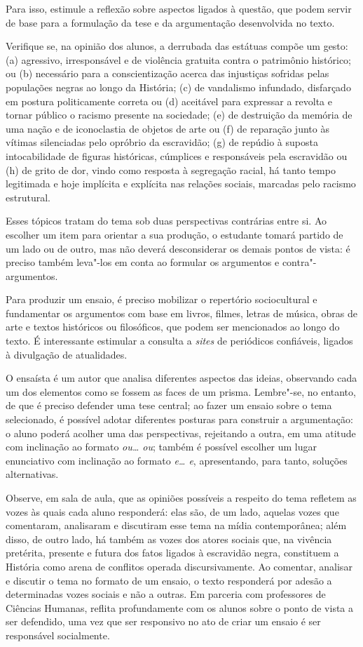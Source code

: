 \documentclass[11pt]{extarticle}
\begin{document}
  Para isso, estimule a reflexão sobre aspectos
  ligados à questão, que podem servir de base para a formulação da tese
  e da argumentação desenvolvida no texto.

Verifique se, na opinião dos alunos, a derrubada das estátuas compõe um
gesto: (a) agressivo, irresponsável e de violência gratuita contra o
patrimônio histórico; ou (b) necessário para a conscientização acerca
das injustiças sofridas pelas populações negras ao longo da História;
(c) de vandalismo infundado, disfarçado em postura politicamente correta
ou (d) aceitável para expressar a revolta e tornar público o racismo
presente na sociedade; (e) de destruição da memória de uma nação e de
iconoclastia de objetos de arte ou (f) de reparação junto às vítimas
silenciadas pelo opróbrio da escravidão; (g) de repúdio à suposta
intocabilidade de figuras históricas, cúmplices e responsáveis pela
escravidão ou (h) de grito de dor, vindo como resposta à segregação
racial, há tanto tempo legitimada e hoje implícita e explícita nas
relações sociais, marcadas pelo racismo estrutural.

Esses tópicos tratam do tema sob duas perspectivas contrárias entre si.
Ao escolher um item para orientar a sua produção, o estudante tomará
partido de um lado ou de outro, mas não deverá desconsiderar os demais
pontos de vista: é preciso também leva"-los em conta ao formular os
argumentos e contra"-argumentos.

Para produzir um ensaio, é preciso mobilizar o repertório sociocultural
e fundamentar os argumentos com base em livros, filmes, letras de
música, obras de arte e textos históricos ou filosóficos, que podem ser
mencionados ao longo do texto. É interessante estimular a consulta a
\emph{sites} de periódicos confiáveis, ligados à divulgação de
atualidades.

O ensaísta é um autor que analisa diferentes aspectos das ideias,
observando cada um dos elementos como se fossem as faces de um prisma.
Lembre"-se, no entanto, de que é preciso defender uma tese central; ao
fazer um ensaio sobre o tema selecionado, é possível adotar diferentes
posturas para construir a argumentação: o aluno poderá acolher uma das
perspectivas, rejeitando a outra, em uma atitude com inclinação ao
formato \emph{ou\ldots{} ou}; também é possível escolher um lugar enunciativo
com inclinação ao formato \emph{e\ldots{} e}, apresentando, para tanto,
soluções alternativas.

Observe, em sala de aula, que as opiniões possíveis a respeito do tema
refletem as vozes às quais cada aluno responderá: elas são, de um lado,
aquelas vozes que comentaram, analisaram e discutiram esse tema na mídia
contemporânea; além disso, de outro lado, há também as vozes dos atores
sociais que, na vivência pretérita, presente e futura dos fatos ligados
à escravidão negra, constituem a História como arena de conflitos
operada discursivamente. Ao comentar, analisar e discutir o tema no
formato de um ensaio, o texto responderá por adesão a determinadas vozes
sociais e não a outras. Em parceria com professores de Ciências Humanas,
reflita profundamente com os alunos sobre o ponto de vista a ser
defendido, uma vez que ser responsivo no ato de criar um ensaio é ser
responsável socialmente.
\end{document}
